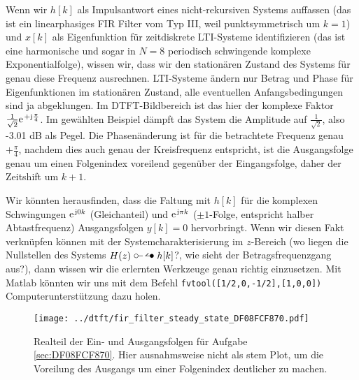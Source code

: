 \begin{Loesung}
Wenn wir $h[k]$ als Impulsantwort eines nicht-rekursiven Systems auffassen
(das ist ein linearphasiges FIR Filter vom Typ III, weil punktsymmetrisch um $k=1$)
und $x[k]$ als Eigenfunktion für zeitdiskrete LTI-Systeme identifizieren
(das ist eine harmonische und sogar in $N=8$ periodisch schwingende komplexe
Exponentialfolge), wissen wir, dass wir den stationären Zustand des Systems
für genau diese Frequenz ausrechnen.
%
LTI-Systeme ändern nur Betrag und Phase für Eigenfunktionen im stationären Zustand,
alle eventuellen Anfangsbedingungen sind ja abgeklungen.
%
Im DTFT-Bildbereich ist das hier der komplexe Faktor
$\frac{1}{\sqrt{2}} \e^{+\im\frac{\pi}{4}}$.
%
Im gewählten Beispiel dämpft das System die Amplitude auf $\frac{1}{\sqrt{2}}$,
also -3.01 dB als Pegel.
%
Die Phasenänderung ist für die betrachtete Frequenz genau $+\frac{\pi}{4}$,
nachdem dies auch genau der Kreisfrequenz entspricht, ist die Ausgangsfolge
genau um einen Folgenindex voreilend gegenüber der Eingangsfolge, daher der
Zeitshift um $k+1$.
%

Wir könnten herausfinden, dass die Faltung mit $h[k]$ für die komplexen
Schwingungen $\e^{\im 0 k}$ (Gleichanteil) und $\e^{\im \pi k}$ ($\pm 1$-Folge,
entspricht halber Abtastfrequenz) Ausgangsfolgen $y[k]=0$ hervorbringt.
%
Wenn wir diesen Fakt verknüpfen können mit der Systemcharakterisierung
im $z$-Bereich (wo liegen die Nullstellen des Systems $H(z) \ztransf h[k]$?,
wie sieht der Betragsfrequenzgang aus?),
dann wissen wir die erlernten Werkzeuge genau richtig einzusetzen. Mit Matlab
könnten wir uns mit dem Befehl \texttt{fvtool([1/2,0,-1/2],[1,0,0])}
Computerunterstützung dazu holen.

\end{Loesung}

\begin{figure}
\centering
\texttt{[image: ../dtft/fir\_filter\_steady\_state\_DF08FCF870.pdf]}
\caption{Realteil der Ein- und Ausgangsfolgen für Aufgabe \ref{sec:DF08FCF870}.
Hier ausnahmsweise nicht als stem Plot, um die Voreilung des Ausgangs
um einer Folgenindex deutlicher zu machen.}
\label{fig:DF08FCF870}
\end{figure}



\clearpage
